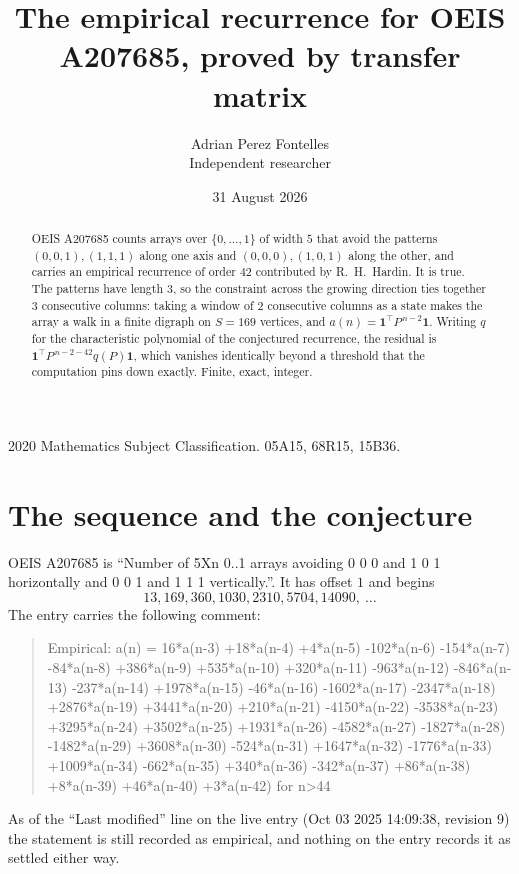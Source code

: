 \documentclass[11pt,a4paper]{article}
\title{The empirical recurrence for OEIS A207685, proved by transfer matrix}
\author{Adrian Perez Fontelles\\ \small Independent researcher}
\date{31 August 2026}
\theoremstyle{plain}
\theoremstyle{definition}
\begin{document}
\maketitle

\begin{abstract}
OEIS A207685 counts arrays over $\{0,\dots,1\}$ of width $5$ that avoid the patterns
$(0,0,1), (1,1,1)$ along one axis and $(0,0,0), (1,0,1)$ along the other, and carries an empirical recurrence of
order $42$ contributed by R.~H.~Hardin. It is true. The patterns have length $3$, so
the constraint across the growing direction ties together $3$ consecutive columns: taking a
window of $2$ consecutive columns as a state makes the array a walk in a finite digraph
on $S=169$ vertices, and $a(n)=\mathbf{1}^{\!\top}P^{\,n-2}\mathbf{1}$. Writing $q$
for the characteristic polynomial of the conjectured recurrence, the residual is
$\mathbf{1}^{\!\top}P^{\,n-2-42}q(P)\mathbf{1}$, which vanishes identically
beyond a threshold that the computation pins down exactly. Finite, exact, integer.
\end{abstract}

\noindent\small 2020 Mathematics Subject Classification. 05A15, 68R15, 15B36.\normalsize

\section{The sequence and the conjecture}

OEIS A207685 is ``Number of 5Xn 0..1 arrays avoiding 0 0 0 and 1 0 1 horizontally and 0 0 1 and 1 1 1 vertically.''. It has offset
$1$ and begins
\[
13, 169, 360, 1030, 2310, 5704, 14090,\ \dots
\]
The entry carries the following comment:
\begin{quote}\small
Empirical: a(n) = 16*a(n-3) +18*a(n-4) +4*a(n-5) -102*a(n-6) -154*a(n-7) -84*a(n-8) +386*a(n-9) +535*a(n-10) +320*a(n-11) -963*a(n-12) -846*a(n-13) -237*a(n-14) +1978*a(n-15) -46*a(n-16) -1602*a(n-17) -2347*a(n-18) +2876*a(n-19) +3441*a(n-20) +210*a(n-21) -4150*a(n-22) -3538*a(n-23) +3295*a(n-24) +3502*a(n-25) +1931*a(n-26) -4582*a(n-27) -1827*a(n-28) -1482*a(n-29) +3608*a(n-30) -524*a(n-31) +1647*a(n-32) -1776*a(n-33) +1009*a(n-34) -662*a(n-35) +340*a(n-36) -342*a(n-37) +86*a(n-38) +8*a(n-39) +46*a(n-40) +3*a(n-42) for n>44
\end{quote}
As of the ``Last modified'' line on the live entry (Oct 03 2025 14:09:38, revision
9) the statement is still recorded as empirical, and nothing on the entry
records it as settled either way.
\end{document}
